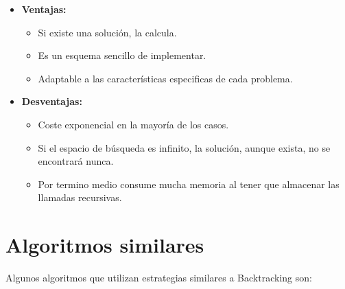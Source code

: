 \documentclass[a4paper,12pt]{article}
\begin{document}
\begin{itemize}
    \item \textbf{Ventajas:}
    \begin{itemize}
        \item Si existe una solución, la calcula.
        \item Es un esquema sencillo de implementar.
        \item Adaptable a las características especificas de cada problema.
    \end{itemize}

    \item \textbf{Desventajas:}
    \begin{itemize}
        \item Coste exponencial en la mayoría de los casos.
        \item Si el espacio de búsqueda es infinito, la solución, aunque exista, no se encontrará nunca.
        \item Por termino medio consume mucha memoria al tener que almacenar las llamadas recursivas.
    \end{itemize}
\end{itemize}



\section{Algoritmos similares}
Algunos algoritmos que utilizan estrategias similares a Backtracking son:
\end{document}
